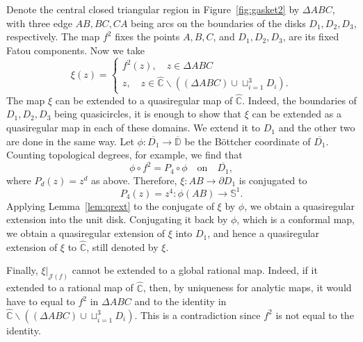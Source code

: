 \documentclass[12pt]{amsart}
\makeatletter
\newtheorem*{ex}{Example}
\newtheorem*{pf}{Proof}
\newcommand{\C}{\mathbb{C}}
\newcommand{\D}{\mathbb{D}}
\newcommand{\N}{\mathbb{N}}
\newcommand{\hC}{\widehat{\C}}
\newcommand{\J}{\mathcal{J}}
\newcommand{\co}{\colon}
\renewenvironment{pf}[1][\proofname]{%
  \par
  \pushQED{\qed}%
  \normalfont\topsep6\p@ \@plus6\p@ \trivlist
  \item[\hskip\labelsep\itshape
        \bfseries #1\@addpunct{:}]%
  \ignorespaces
}{%
  \popQED\endtrivlist
}
\renewenvironment{ex}[1][\examplename]{%
  \par
  \pushQED{\qed}%
  \normalfont\topsep6\p@ \@plus6\p@ \trivlist
  \item[\hskip\labelsep\itshape
        \bfseries #1\@addpunct{:}]%
  \ignorespaces
}{%
  \popQED\endtrivlist
}
\renewenvironment{ex}{%
  \normalfont\topsep6\p@ \@plus6\p@ \trivlist
  \item[\hskip\labelsep\bfseries Example:]%
  \ignorespaces
}{%
  \endtrivlist
}
\makeatother
\begin{document}
\begin{ex}
\begin{pf}
  
  Denote the central closed triangular region in Figure~\ref{fig:gasket2} by $\Delta ABC$, with three edge $AB, BC, CA$ being arcs on the boundaries of the disks $D_1, D_2, D_3$, respectively. The map $f^2$ fixes the points $A, B, C$, and $D_1,D_2,D_3$,  are its fixed Fatou components.
  Now we take 
  $$\xi(z)= \begin{cases}
  f^2(z),  \quad z\in \Delta ABC  \\
  z,\quad z\in \hC\backslash \left((\Delta ABC)\cup \sqcup_{i=1}^{3}D_i\right).
  \end{cases}
  $$
  The map $\xi$ can be extended to a quasiregular map of $\hC$. Indeed, the boundaries of $D_1, D_2, D_3$ being quasicircles, it is enough to show that $\xi$ can be extended as a quasiregular map in each of these domains.
  We extend it to $D_1$ and the other two are done in the same way. 
  Let $\phi\co\overline{D_1}\to \overline{\D}$ be the B\"ottcher coordinate of $\overline{D_1}$.
  Counting topological degrees, for example, we find that 
  $$\phi\circ f^2=P_4\circ \phi \quad \mathrm{on} \quad \overline{D_1},$$ where $P_d(z)=z^d$ as above. Therefore, $\xi\co AB\to \partial D_1$ is conjugated to 
  $$P_4(z)=z^4\co\phi(AB)\to \mathbb{S}^1.$$
  Applying Lemma~\ref{lem:qrext} to the conjugate of $\xi$ by $\phi$, we obtain a quasi\-re\-gu\-lar extension into the unit disk. Conjugating it back by $\phi$, which is a conformal map, we obtain a quasiregular extension of $\xi$ into $D_1$, and hence a quasiregular extension of $\xi$ to $\hC$, still denoted by $\xi$. 
  
  Finally, $\xi|_{\J(f)}$ cannot be extended to a global rational map. Indeed, if it extended to a rational map of $\widehat{\C}$, then, by uniqueness for analytic maps, it would have to equal to $f^2$ in $\Delta ABC$ and to the identity in $\hC\backslash \left((\Delta ABC)\cup \sqcup_{i=1}^{3}D_i\right)$. This is a contradiction since $f^2$ is not equal to the identity.    
\end{pf}

\end{ex}
\end{document}
